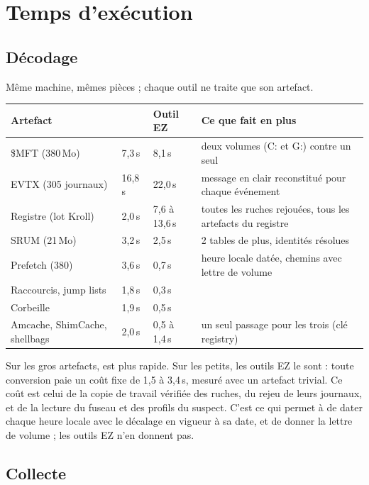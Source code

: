\documentclass[11pt,a4paper,oneside]{report}
\begin{document}
\chapter{Temps d'exécution}

\section{Décodage}

Même machine, mêmes pièces ; chaque outil ne traite que son artefact.

\begin{longtable}{@{}L{3.6cm}L{2.2cm}L{2.2cm}L{7.0cm}@{}}
\toprule
\textbf{Artefact} & \textbf{\wac{}} & \textbf{Outil EZ} & \textbf{Ce que fait \wac{} en plus} \\
\midrule\endhead
\$MFT (380\,Mo) & 7,3\,s & 8,1\,s & deux volumes (C: et G:) contre un seul \\
EVTX (305 journaux) & 16,8\,s & 22,0\,s & message en clair reconstitué pour chaque événement \\
Registre (lot Kroll) & 2,0\,s & 7,6 à 13,6\,s & toutes les ruches rejouées, tous les artefacts du registre \\
SRUM (21\,Mo) & 3,2\,s & 2,5\,s & 2 tables de plus, identités résolues \\
Prefetch (380) & 3,6\,s & 0,7\,s & heure locale datée, chemins avec lettre de volume \\
Raccourcis, jump lists & 1,8\,s & 0,3\,s & \\
Corbeille & 1,9\,s & 0,5\,s & \\
Amcache, ShimCache, shellbags & 2,0\,s & 0,5 à 1,4\,s & un seul passage pour les trois (clé registry) \\
\bottomrule
\end{longtable}

Sur les gros artefacts, \wac{} est plus rapide. Sur les petits, les outils EZ le
sont : toute conversion \wac{} paie un coût fixe de 1,5 à 3,4\,s, mesuré avec un
artefact trivial. Ce coût est celui de la copie de travail vérifiée des ruches, du
rejeu de leurs journaux, et de la lecture du fuseau et des profils du suspect.
C'est ce qui permet à \wac{} de dater chaque heure locale avec le décalage en
vigueur à sa date, et de donner la lettre de volume ; les outils EZ n'en
donnent pas.

\section{Collecte}
\end{document}

